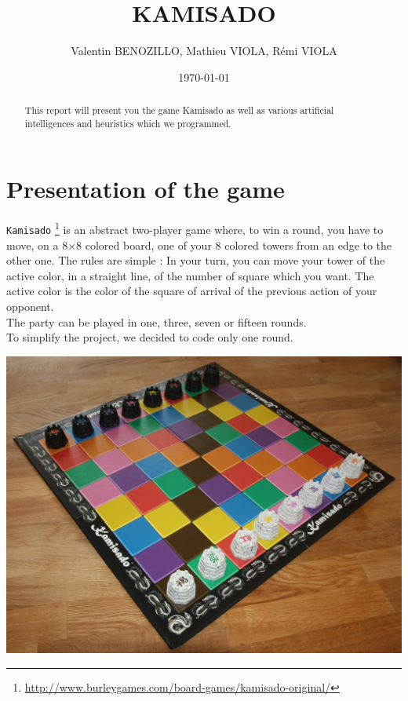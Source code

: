 \documentclass[a4paper, 11pt]{article}
\title{KAMISADO}
\author{Valentin BENOZILLO, Mathieu VIOLA, Rémi VIOLA}
\date{\today}
\begin{document}
\maketitle

\begin{abstract}
This report will present you the game Kamisado as well as various artificial intelligences and heuristics which we programmed.
\end{abstract}

\newpage

\tableofcontents

\newpage

\section{Presentation of the game}
\verb?Kamisado? \footnote{\url{http://www.burleygames.com/board-games/kamisado-original/}} is an abstract two-player game where, to win a round, you have to move, on a 8$\times$8 colored board, one of your 8 colored towers from an edge to the other one. The rules are simple : In your turn, you can move your tower of the active color, in a straight line, of the number of square which you want. The active color is the color of the square of arrival of the previous action of your opponent.\\
The party can be played in one, three, seven or fifteen rounds.\\
To simplify the project, we decided to code only one round.
\begin{center}
\includegraphics[scale = 0.09]{kamisado.jpeg}
\end{center}
\end{document}
